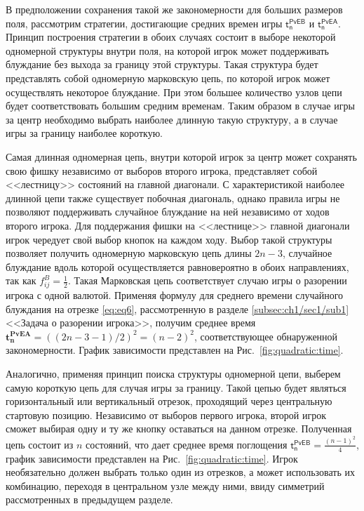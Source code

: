В предположении сохранения такой же закономерности для больших размеров поля, рассмотрим стратегии, достигающие средних времен игры $\boldsymbol{\mathsf{t_n^{PvE B}}}$ и $\boldsymbol{\mathsf{t_n^{PvE A}}}$. Принцип построения стратегии в обоих случаях состоит в выборе некоторой одномерной структуры внутри поля, на которой игрок может поддерживать блуждание без выхода за границу этой структуры. Такая структура будет представлять собой одномерную марковскую цепь, по которой игрок может осуществлять некоторое блуждание. При этом большее количество узлов цепи будет соответствовать большим средним временам. Таким образом в случае игры за центр необходимо выбрать наиболее длинную такую структуру, а в случае игры за границу наиболее короткую.

Самая длинная одномерная цепь, внутри которой игрок за центр может сохранять свою фишку независимо от выборов второго игрока, представляет собой <<лестницу>> состояний на главной диагонали. С характеристикой наиболее длинной цепи также существует побочная диагональ, однако правила игры не позволяют поддерживать случайное блуждание на ней независимо от ходов второго игрока. Для поддержания фишки на <<лестнице>> главной диагонали игрок чередует свой выбор кнопок на каждом ходу. Выбор такой структуры позволяет получить одномерную марковскую цепь длины $2n-3$, случайное блуждание вдоль которой осуществляется равновероятно в обоих направлениях, так как $f_{ij}^B=\frac{1}{2}$. Такая Марковская цепь соответствует случаю игры о разорении игрока с одной валютой. Применяя формулу для среднего времени случайного блуждания на отрезке \eqref{eq:eq6}, рассмотренную в разделе \cref{subsec:ch1/sec1/sub1} <<Задача о разорении игрока>>, получим среднее время $\boldsymbol{t_n^{PvE A}} = ((2n-3-1)/2)^2 = (n-2)^2$, соответствующее обнаруженной закономерности. График зависимости представлен на Рис.~\cref{fig:quadratic:time}.

Аналогично, применяя принцип поиска структуры одномерной цепи, выберем самую короткую цепь для случая игры за границу. Такой цепью будет являться горизонтальный или вертикальный отрезок, проходящий через центральную стартовую позицию. Независимо от выборов первого игрока, второй игрок сможет выбирая одну и ту же кнопку оставаться на данном отрезке. Полученная цепь состоит из $n$ состояний, что дает среднее время поглощения $\boldsymbol{\mathsf{t_n^{PvE B}}} = \frac{(n-1)^2}{4}$, график зависимости представлен на Рис.~\cref{fig:quadratic:time}. Игрок необязательно должен выбрать только один из отрезков, а может использовать их комбинацию, переходя в центральном узле между ними, ввиду симметрий рассмотренных в предыдущем разделе. 

